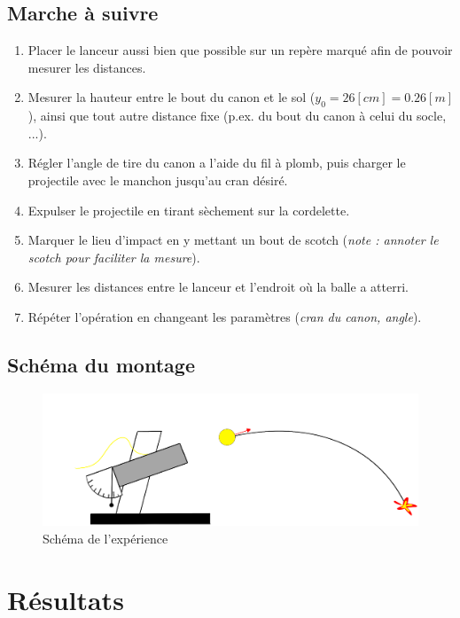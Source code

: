 \documentclass[11pt]{article}
\begin{document}
\subsection{Marche à suivre}
\begin{enumerate}
\item Placer le lanceur aussi bien que possible sur un repère marqué afin de pouvoir mesurer les distances. 
\item Mesurer la hauteur entre le bout du canon et le sol ($y_0 = 26 [cm] = 0.26[m]$), ainsi que tout autre distance fixe (p.ex. du bout du canon à celui du socle, ...).
\item Régler l’angle de tire du canon a l’aide du fil à plomb, puis charger le projectile avec le manchon jusqu'au cran désiré.
\item Expulser le projectile en tirant sèchement sur la cordelette.
\item Marquer le lieu d’impact en y mettant un bout de scotch (\textit{note : annoter le scotch pour faciliter la mesure}).
\item  Mesurer les distances entre le lanceur et l’endroit où la balle a atterri.
\item Répéter l'opération en changeant les paramètres (\textit{cran du canon, angle}). 
\end{enumerate}

\subsection{Schéma du montage}
\begin{center}
\begin{figure}[H]
  \includegraphics[scale=1]{schema.png}
  \caption{Schéma de l'expérience}
\end{figure}
\end{center}



\section{Résultats}
\end{document}
